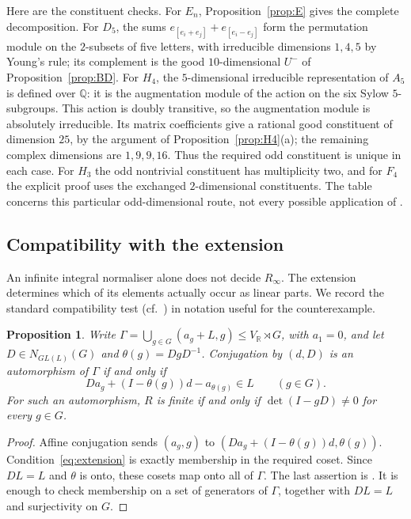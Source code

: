 \documentclass[11pt]{article}
\newtheorem{proposition}[theorem]{Proposition}
\theoremstyle{definition}
\newcommand{\Q}{\mathbb{Q}}
\newcommand{\Rinf}{R_\infty}
\begin{document}
Here are the constituent checks. For $E_n$, Proposition~\ref{prop:E} gives the complete decomposition.
For $D_5$, the sums $e_{[e_i+e_j]}+e_{[e_i-e_j]}$ form the permutation module on the $2$-subsets of five
letters, with irreducible dimensions $1,4,5$ by Young's rule; its complement is the good $10$-dimensional
$U^-$ of Proposition~\ref{prop:BD}. For $H_4$, the $5$-dimensional irreducible representation of $A_5$ is
defined over $\Q$: it is the augmentation module of the action on the six Sylow $5$-subgroups.
This action is doubly transitive, so the augmentation module is absolutely irreducible. Its matrix
coefficients give a rational good constituent of dimension $25$, by the argument of
Proposition~\ref{prop:H4}(a); the remaining complex dimensions are $1,9,9,16$.
Thus the required odd constituent is unique in each case. For $H_3$ the odd nontrivial constituent has
multiplicity two, and for $F_4$ the explicit proof uses the exchanged $2$-dimensional constituents.
The table concerns this particular odd-dimensional route, not every possible application of \cite{HL25,HL26}.

\subsection{Compatibility with the extension}

An infinite integral normaliser alone does not decide $\Rinf$. The extension determines which of its
elements actually occur as linear parts. We record the standard compatibility test
(cf.\ \cite[Algorithm~1]{DKT19}) in notation useful for the counterexample.

\begin{proposition}\label{prop:extension}
Write $\Gamma=\bigcup_{g\in G}(a_g+L,g)\le V_\mathbb R\rtimes G$, with $a_1=0$, and let
$D\in N_{GL(L)}(G)$ and $\theta(g)=DgD^{-1}$. Conjugation by $(d,D)$ is an automorphism of $\Gamma$ if and
only if
\begin{equation}\label{eq:extension}
Da_g+(I-\theta(g))d-a_{\theta(g)}\in L\qquad(g\in G).
\end{equation}
For such an automorphism, $R$ is finite if and only if $\det(I-gD)\ne0$ for every $g\in G$.
\end{proposition}
\begin{proof}
Affine conjugation sends $(a_g,g)$ to $(Da_g+(I-\theta(g))d,\theta(g))$.
Condition~\eqref{eq:extension} is exactly membership in the required coset. Since $DL=L$ and $\theta$ is
onto, these cosets map onto all of $\Gamma$. The last assertion is \cite[Thm.~3.3]{DKT19}.
It is enough to check membership on a set of generators of $\Gamma$, together with $DL=L$ and
surjectivity on $G$.
\end{proof}
\end{document}
